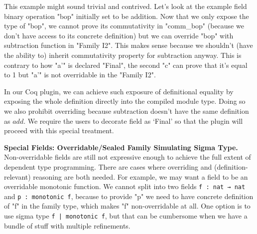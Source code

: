 This example might sound trivial and contrived. Let's look at the
example field binary operation "bop" initially set to be addition. Now that we only expose the type of "bop", we
cannot prove its commutativity in "comm_bop" (because we don't have
access to its concrete definition) but we can override "bop" with
subtraction function in "Family I2". This makes sense because we
shouldn't (have the ability to) inherit commutativity property for subtraction
anyway. This is contrary to how "a'" is declared "Final", the second "c"
can prove that it's equal to 1 but "a'" is not overridable in the
"Family I2".


In our Coq plugin, we can achieve such exposure of definitional equality by
exposing the whole definition directly into the compiled module type. Doing so we also prohibit overriding because
subtraction doesn't have the same definition as $add$. We require the
users to decorate field as `Final' so that the plugin will proceed with
this special treatment.

\textbf{Special Fields: Overridable/Sealed Family Simulating Sigma Type.} 
Non-overridable fields are still not expressive enough to achieve the full
extent of dependent type programming. There are cases where overriding and
(definition-relevant) reasoning are both needed. For example, we may want a field to be an overridable monotonic function. We cannot split into two fields
\texttt{f : nat → nat} and \texttt{p : monotonic f},
because to provide
"p" we need to have concrete definition of "f" in the family type, which
makes "f" non-overridable at all. One option is to use sigma type
\texttt{{f | monotonic f}}, but that can be cumbersome when we have
a bundle of stuff with multiple refinements. 

